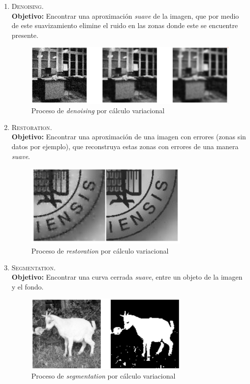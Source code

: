 \begin{enumerate}
    \item \textsc{Denoising}. \\ \textbf{Objetivo:} Encontrar una aproximación \textit{suave} de la imagen, que por medio de este suavizamiento elimine el ruido en las zonas donde este se encuentre presente.
    \begin{figure}[htpb!]
    \centering
    \includegraphics[width=11cm]{denoising}
    \caption{Proceso de \textit{denoising} por cálculo variacional}
    \label{fig:dendro}
    \end{figure}

    \item \textsc{Restoration}. \\ \textbf{Objetivo:} Encontrar una aproximación de una imagen con errores (zonas sin datos por ejemplo), que reconstruya estas zonas con errores de una manera \textit{suave}.
    \begin{figure}[htpb!]
    \centering
    \includegraphics[width=8cm]{restoration}
    \caption{Proceso de \textit{restoration} por cálculo variacional}
    \label{fig:dendro}
    \end{figure}

    \item \textsc{Segmentation}. \\ \textbf{Objetivo:} Encontrar una curva cerrada \textit{suave}, entre un objeto de la imagen y el fondo.
     \begin{figure}[htpb!]
    \centering
    \includegraphics[width=8cm]{segmentation}
    \caption{Proceso de \textit{segmentation} por cálculo variacional}
    \label{fig:dendro}
    \end{figure}


\end{enumerate}
